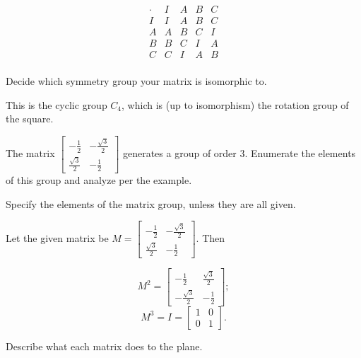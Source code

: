 \documentclass[../key.tex]{subfiles}
\begin{document}
$$\begin{array}{c|c|c|c|c|}
\cdot & I & A & B & C \\
I & I & A & B & C \\
A & A & B & C & I \\
B & B & C & I & A \\
C & C & I & A & B \\
\end{array}$$

\begin{iinner_problem}
\item Decide which symmetry group your matrix is isomorphic to.
\end{iinner_problem}

This is the cyclic group $C_4$, which is (up to isomorphism) the rotation group of the square.

\begin{outer_problem}
\item The matrix $\left[\begin{array}{cc} -\frac{1}{2} & -\frac{\sqrt{3}}{2} \\ \frac{\sqrt{3}}{2} & -\frac{1}{2}\end{array}\right]$ generates a group of order $3$. Enumerate the elements of this group and analyze per the example.
\end{outer_problem}

\begin{iinner_problem}[start=1]
\item Specify the elements of the matrix group, unless they are all given.
\end{iinner_problem}

Let the given matrix be $M=\begin{bmatrix} -\frac{1}{2} & -\frac{\sqrt{3}}{2} \\ \frac{\sqrt{3}}{2} & -\frac{1}{2}\end{bmatrix}$. Then

$$M^2=\begin{bmatrix} -\frac{1}{2} & \frac{\sqrt{3}}{2} \\ -\frac{\sqrt{3}}{2} & -\frac{1}{2}\end{bmatrix};$$
$$M^3=I=\begin{bmatrix} 1 & 0 \\ 0 & 1 \end{bmatrix}.$$

\begin{iinner_problem}
\item Describe what each matrix does to the plane.
\end{iinner_problem}
\end{document}
